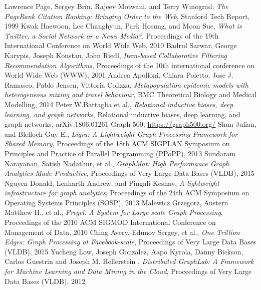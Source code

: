 \documentclass[english]{thesis}
\begin{document}
\begin{thebibliography}{99}
 Lawrence Page, Sergey Brin, Rajeev Motwani, and Terry Winograd, \emph{The PageRank Citation Ranking: Bringing Order to the Web}, Stanford Tech Report, 1999
 Kwak Haewoon, Lee Changhyun, Park Hosung, and Moon Sue, \emph{What is Twitter, a Social Network or a News Media?}, Proceedings of the 19th International Conference on World Wide Web, 2010
 Badrul Sarwar, George Karypis, Joseph Konstan, John Riedl, \emph{Item-based Collaborative Filtering Recommendation Algorithms}, Proceedings of the 10th international conference on World Wide Web (WWW), 2001
 Andrea Apolloni, Chiara Poletto, Jose J. Ramasco, Pablo Jensen, Vittoria Colizza, \emph{Metapopulation epidemic models with heterogeneous mixing and travel behaviour}, BMC Theoretical Biology and Medical Modelling, 2014
 Peter W.Battaglia et al., \emph{Relational inductive biases, deep learning, and graph networks}, Relational inductive biases, deep learning, and graph networks, arXiv:1806.01261
 Graph 500, \url{https://graph500.org/}
 Shun Julian, and Blelloch Guy E., \emph{Ligra: A Lightweight Graph Processing Framework for Shared Memory}, Proceedings of the 18th ACM SIGPLAN Symposium on Principles and Practice of Parallel Programming (PPoPP), 2013
 Sundaram Narayanan, Satish Nadathur, et al., \emph{GraphMat: High Performance Graph Analytics Made Productive}, Proceedings of Very Large Data Bases (VLDB), 2015
 Nguyen Donald, Lenharth Andrew, and Pingali Keshav, \emph{A lightweight infrastructure for graph analytics}, Proceedings of the 24th ACM Symposium on Operating Systems Principles (SOSP), 2013
 Malewicz Grzegorz, Austern Matthew H., et al., \emph{Pregel: A System for Large-scale Graph Processing}, Proceedings of the 2010 ACM SIGMOD International Conference on Management of Data, 2010
 Ching Avery, Edunov Sergey, et al., \emph{One Trillion Edges: Graph Processing at Facebook-scale}, Proceedings of Very Large Data Bases (VLDB), 2015
 Yucheng Low, Joseph Gonzalez, Aapo Kyrola, Danny Bickson, Carlos Guestrin and Joseph M. Hellerstein , \emph{Distributed GraphLab: A Framework for Machine Learning and Data Mining in the Cloud}, Proceedings of Very Large Data Bases (VLDB), 2012
\end{thebibliography}
\end{document}
